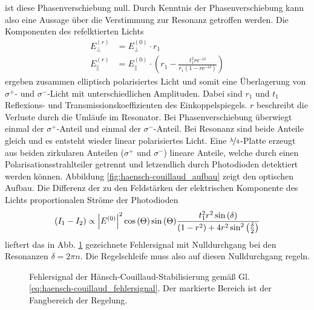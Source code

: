 ist diese Phasenverschiebung null. Durch Kenntnis der Phasenverschiebung kann
also eine Aussage über die Verstimmung zur Resonanz getroffen werden. Die
Komponenten des refelktierten Lichts
\begin{equation}\label{eq:haensch-couillaud_02}
	\begin{split}
		E_{\perp}^{(r)} & = E_{\perp}^{(0)}\cdot r_1\\
		E_{\parallel}^{(r)} & = E_{\parallel}^{(0)}\cdot\left(r_1-\frac{t_1^2r\mathrm{e}^{-\mathrm{i}\delta}}{r_1\left(1-r\mathrm{e}^{-\mathrm{i}\delta}\right)}\right)
	\end{split}
\end{equation}
ergeben zusammen elliptisch polarisiertes Licht und somit eine Überlagerung von
$\sigma^+$- und $\sigma^-$-Licht mit unterschiedlichen Amplituden. Dabei sind
$r_1$ und $t_1$ Reflexions- und Transmissionskoeffizienten des
Einkoppelspiegels. $r$ beschreibt die Verluste durch die Umläufe im Resonator.
Bei Phasenverschiebung überwiegt einmal der $\sigma^+$-Anteil und einmal der $\sigma^-$-Anteil. Bei Resonanz sind beide Anteile gleich und es entsteht wieder linear polarisiertes Licht. Eine $\nicefrac{\lambda}{4}$-Platte erzeugt aus
beiden zirkularen Anteilen ($\sigma^+$ und $\sigma^-$) lineare Anteile, welche
durch einen Polarisationsstrahlteiler getrennt und letzendlich durch Photodioden
detektiert werden können. Abbildung \ref{fig:haensch-couillaud_aufbau} zeigt den
optischen Aufbau. Die Differenz der zu den Feldstärken der elektrischen Komponente
des Lichts proportionalen Ströme der Photodioden
\begin{equation}\label{eq:haensch-couillaud_fehlersignal}
	(I_1-I_2)\propto\left|E^{(0)}\right|^2\cos{(\Theta)}\sin{(\Theta)}\frac{t_1^2r^2\sin{(\delta)}}{(1-r^2)+4r^2\sin^2{\left(\frac{\delta}{2}\right)}}
\end{equation}
lieftert das in Abb. \ref{fig:haensch-couillaud_fehlersignal} gezeichnete
Fehlersignal mit Nulldurchgang bei den Resonanzen $\delta=2\pi n$. Die
Regelschleife muss also auf diesen Nulldurchgang regeln.
\begin{figure}[h]
	\centering
	\footnotesize
	
	\caption[Hänsch-Couillaud - Fehlersignal]{Fehlersignal der
	Hänsch-Couillaud-Stabilisierung
	gemäß Gl.
	\eqref{eq:haensch-couillaud_fehlersignal}.
	Der markierte Bereich ist der
	Fangbereich der Regelung.}\label{fig:haensch-couillaud_fehlersignal}
\end{figure}

